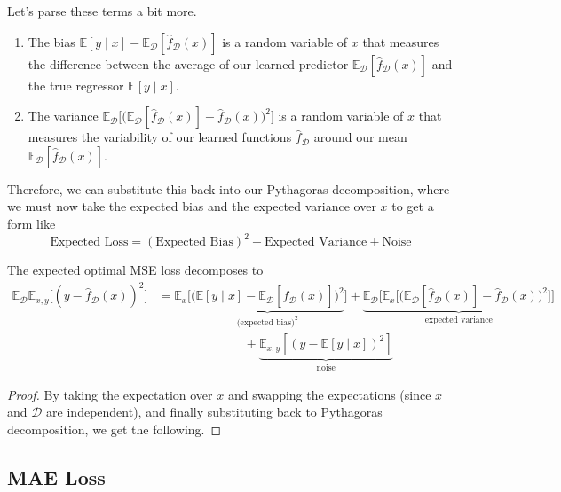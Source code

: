   Let's parse these terms a bit more. 
  \begin{enumerate}
    \item The bias $\mathbb{E}[y \mid x] - \mathbb{E}_{\mathcal{D}} [\hat{f}_\mathcal{D} (x)]$ is a random variable of $x$ that measures the difference between the average of our learned predictor $\mathbb{E}_{\mathcal{D}} [\hat{f}_\mathcal{D} (x)]$ and the true regressor $\mathbb{E}[y \mid x]$. 

    \item The variance $\mathbb{E}_\mathcal{D} \big[ \big( \mathbb{E}_\mathcal{D} [\hat{f}_\mathcal{D} (x)] - \hat{f}_\mathcal{D} (x) \big)^2 \big]$ is a random variable of $x$ that measures the variability of our learned functions $\hat{f}_{\mathcal{D}}$ around our mean $\mathbb{E}_\mathcal{D} [\hat{f}_\mathcal{D} (x)]$. 
  \end{enumerate}

  Therefore, we can substitute this back into our Pythagoras decomposition, where we must now take the expected bias and the expected variance over $x$ to get a form like 
  \begin{equation}
    \text{Expected Loss} = (\text{Expected Bias})^2 + \text{Expected Variance} + \text{Noise}
  \end{equation}

  \begin{corollary} 
    \label{bias_variance_mse}
    The expected optimal MSE loss decomposes to 
    \begin{align}
      \mathbb{E}_{\mathcal{D}} \mathbb{E}_{x, y} \big[ (y - \hat{f}_{\mathcal{D}}(x))^2 \big] 
      & = \mathbb{E}_{x} \big[ \underbrace{ \big( \mathbb{E}[y \mid x] - \mathbb{E}_{\mathcal{D}} [\hat{f}_\mathcal{D} (x)] \big)^2}_{\text{(expected bias)}^2} \big] + \underbrace{ \mathbb{E}_\mathcal{D} \big[ \mathbb{E}_{x} \big[ \big( \mathbb{E}_\mathcal{D} [\hat{f}_\mathcal{D} (x)] - \hat{f}_\mathcal{D} (x) \big)^2 \big] \big]}_{\text{expected variance}} \\ 
      & \;\;\;\;\;\;\;\;\;\;\;\;\;\;\;\;\;\;\;\;\;\;\;\;\; + \underbrace{\mathbb{E}_{x, y} [(y - \mathbb{E}[y \mid x])^2]}_{\text{noise}}
    \end{align}
  \end{corollary}
  \begin{proof}
    By taking the expectation over $x$ and swapping the expectations (since $x$ and $\mathcal{D}$ are independent), and finally substituting back to Pythagoras decomposition, we get the following. 
  \end{proof}
  
\subsection{MAE Loss} 

  

